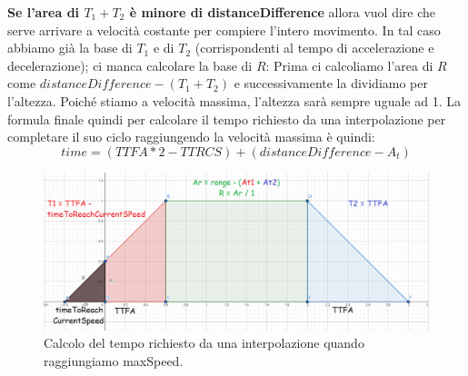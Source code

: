 \documentclass[main.tex]{subfiles}
\begin{document}
\textbf{Se l'area di $T_1 + T_2$ è minore di distanceDifference} allora vuol dire che serve arrivare a velocità costante per compiere l'intero movimento. In tal caso abbiamo già la base di $T_1$ e di $T_2$ (corrispondenti al tempo di accelerazione e decelerazione); ci manca calcolare la base di $R$: Prima ci calcoliamo l'area di $R$ come $distanceDifference - (T_1 + T_2)$ e successivamente la dividiamo per l'altezza. Poiché stiamo a velocità massima, l'altezza sarà sempre uguale ad 1. La formula finale quindi per calcolare il tempo richiesto da una interpolazione per completare il suo ciclo raggiungendo la velocità massima è quindi:
\[time = (TTFA * 2 - TTRCS) + (distanceDifference - A_t)\]
\begin{figure}[H]
    \centering
    \includegraphics[width=1\linewidth]{img/interpolazione/speedCapTotalAreaCalc.png}
    \caption{Calcolo del tempo richiesto da una interpolazione quando raggiungiamo maxSpeed.}
    \label{fig:4_speedCapTotalAreaCalc}
\end{figure}
\end{document}
